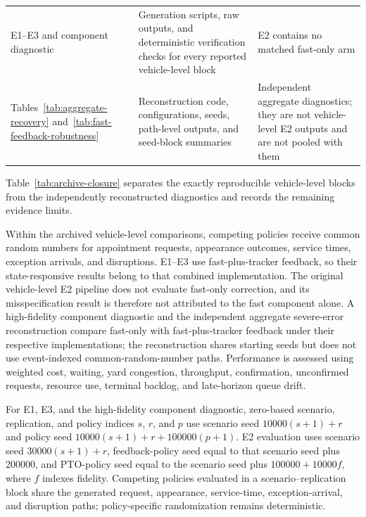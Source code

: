 \documentclass[preprint,12pt,authoryear,a4paper]{elsarticle}
\begin{document}
\begin{table}[htbp]
\begin{tabularx}{\textwidth}{>{\raggedright\arraybackslash}p{2.45cm}>{\raggedright\arraybackslash}p{6.15cm}>{\raggedright\arraybackslash}X}
E1--E3 and component diagnostic & Generation scripts, raw outputs, and deterministic verification checks for every reported vehicle-level block & E2 contains no matched fast-only arm \\
Tables~\ref{tab:aggregate-recovery} and~\ref{tab:fast-feedback-robustness} & Reconstruction code, configurations, seeds, path-level outputs, and seed-block summaries & Independent aggregate diagnostics; they are not vehicle-level E2 outputs and are not pooled with them \\
\bottomrule
\end{tabularx}
\end{table}

Table~\ref{tab:archive-closure} separates the exactly reproducible vehicle-level blocks from the independently reconstructed diagnostics and records the remaining evidence limits.

Within the archived vehicle-level comparisons, competing policies receive common random numbers for appointment requests, appearance outcomes, service times, exception arrivals, and disruptions. E1--E3 use fast-plus-tracker feedback, so their state-responsive results belong to that combined implementation. The original vehicle-level E2 pipeline does not evaluate fast-only correction, and its misspecification result is therefore not attributed to the fast component alone. A high-fidelity component diagnostic and the independent aggregate severe-error reconstruction compare fast-only with fast-plus-tracker feedback under their respective implementations; the reconstruction shares starting seeds but does not use event-indexed common-random-number paths. Performance is assessed using weighted cost, waiting, yard congestion, throughput, confirmation, unconfirmed requests, resource use, terminal backlog, and late-horizon queue drift.

For E1, E3, and the high-fidelity component diagnostic, zero-based scenario, replication, and policy indices \(s\), \(r\), and \(p\) use scenario seed \(10000(s+1)+r\) and policy seed \(10000(s+1)+r+100000(p+1)\). E2 evaluation uses scenario seed \(30000(s+1)+r\), feedback-policy seed equal to that scenario seed plus 200000, and PTO-policy seed equal to the scenario seed plus \(100000+10000f\), where \(f\) indexes fidelity. Competing policies evaluated in a scenario--replication block share the generated request, appearance, service-time, exception-arrival, and disruption paths; policy-specific randomization remains deterministic.
\end{document}
